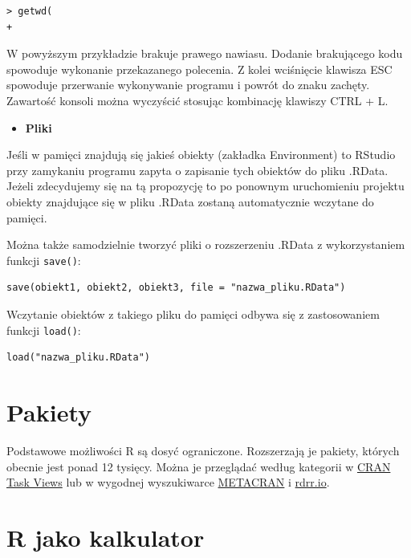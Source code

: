 \documentclass[
]{book}
\providecommand{\tightlist}{%
  \setlength{\itemsep}{0pt}\setlength{\parskip}{0pt}}
\begin{document}
\begin{verbatim}
> getwd(
+ 
\end{verbatim}

W powyższym przykładzie brakuje prawego nawiasu. Dodanie brakującego kodu spowoduje wykonanie przekazanego polecenia. Z kolei wciśnięcie klawisza ESC spowoduje przerwanie wykonywanie programu i powrót do znaku zachęty. Zawartość konsoli można wyczyścić stosując kombinację klawiszy CTRL + L.

\begin{itemize}
\tightlist
\item
  \textbf{Pliki }
\end{itemize}

Jeśli w pamięci znajdują się jakieś obiekty (zakładka Environment) to RStudio przy zamykaniu programu zapyta o zapisanie tych obiektów do pliku .RData. Jeżeli zdecydujemy się na tą propozycję to po ponownym uruchomieniu projektu obiekty znajdujące się w pliku .RData zostaną automatycznie wczytane do pamięci.

Można także samodzielnie tworzyć pliki o rozszerzeniu .RData z wykorzystaniem funkcji \texttt{save()}:

\begin{verbatim}
save(obiekt1, obiekt2, obiekt3, file = "nazwa_pliku.RData")
\end{verbatim}

Wczytanie obiektów z takiego pliku do pamięci odbywa się z zastosowaniem funkcji \texttt{load()}:

\begin{verbatim}
load("nazwa_pliku.RData")
\end{verbatim}

\hypertarget{pakiety}{%
\section{Pakiety}\label{pakiety}}

Podstawowe możliwości R są dosyć ograniczone. Rozszerzają je pakiety, których obecnie jest ponad 12 tysięcy. Można je przeglądać według kategorii w \href{https://cran.r-project.org/web/views/}{CRAN Task Views} lub w wygodnej wyszukiwarce \href{https://www.r-pkg.org/}{METACRAN} i \href{https://rdrr.io/}{rdrr.io}.

\hypertarget{r-jako-kalkulator}{%
\section{R jako kalkulator}\label{r-jako-kalkulator}}
\end{document}
